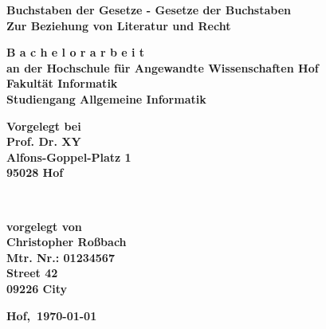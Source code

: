 \begin{titlepage} %
	
	\center %
	
	\textbf{\Large Buchstaben der Gesetze - Gesetze der Buchstaben}\\[0.5cm]
	\textbf{\large Zur Beziehung von Literatur und Recht}\\[0.5cm]

  \vspace{3cm}

	\textbf{\Large B a c h e l o r a r b e i t}\\[0.8cm]
	
	\textbf{an der Hochschule für Angewandte Wissenschaften Hof\\
  Fakultät Informatik\\
  Studiengang Allgemeine Informatik}\\[0.5cm]
	
  \vfill\vfill\vfill

	\begin{minipage}{0.4\textwidth}
		\begin{flushleft}
			\textbf{Vorgelegt bei\\
      Prof. Dr. XY\\
      Alfons-Goppel-Platz 1\\
      95028 Hof
      }
		\end{flushleft}
	\end{minipage}
	~
	\begin{minipage}{0.4\textwidth}
		\begin{flushright}
			\textbf{
      vorgelegt von\\
      Christopher Roßbach\\
      Mtr. Nr.: 01234567\\
      Street 42\\
      09226 City
      }
		\end{flushright}
	\end{minipage}
	
  \vfill

	
	\textbf{Hof,~\today} %
	
	
\end{titlepage}
\restoregeometry
